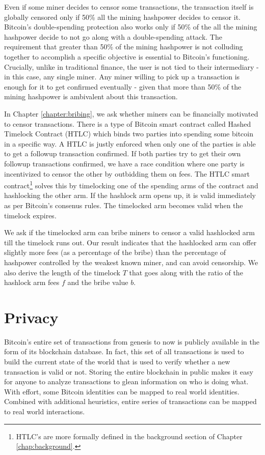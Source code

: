 Even if some miner decides to censor some transactions, the transaction itself is globally censored only if 50\% all the mining hashpower decides to censor it. Bitcoin's double-spending protection also works only if 50\% of the all the mining hashpower decide to not go along with a double-spending attack. The requirement that greater than 50\% of the mining hashpower is not colluding together to accomplish a specific objective is essential to Bitcoin's functioning. Crucially, unlike in traditional finance, the user is not tied to their intermediary - in this case, any single miner. Any miner willing to pick up a transaction is enough for it to get confirmed eventually - given that more than 50\% of the mining hashpower is ambivalent about this transaction.

In Chapter \ref{chapter:bribing}, we ask whether miners can be financially motivated to censor transactions. There is a type of Bitcoin smart contract called Hashed Timelock Contract (HTLC) which binds two parties into spending some bitcoin in a specific way. A HTLC is justly enforced when only one of the parties is able to get a followup transaction confirmed. If both parties try to get their own followup transactions confirmed, we have a race condition where one party is incentivized to censor the other by outbidding them on fees. The HTLC smart contract\footnote{HTLC's are more formally defined in the background section of Chapter \ref{chap:background}.} solves this by timelocking one of the spending arms of the contract and hashlocking the other arm. If the hashlock arm opens up, it is valid immediately as per Bitcoin's consenus rules. The timelocked arm becomes valid when the timelock expires. 

We ask if the timelocked arm can bribe miners to censor a valid hashlocked arm till the timelock runs out. Our result indicates that the hashlocked arm can offer slightly more fees (as a percentage of the bribe) than the percentage of hashpower controlled by the weakest known miner, and can avoid censorship. We also derive the length of the timelock $T$ that goes along with the ratio of the hashlock arm fees $f$ and the bribe value $b$.

\section{Privacy}
Bitcoin's entire set of transactions from genesis to now is publicly available in the form of its blockchain database. In fact, this set of all transactions is used to build the current state of the world that is used to verify whether a new transaction is valid or not. Storing the entire blockchain in public makes it easy for anyone to analyze transactions to glean information on who is doing what. With effort, some Bitcoin identities can be mapped to real world identities. Combined with additional heuristics, entire series of transactions can be mapped to real world interactions.

